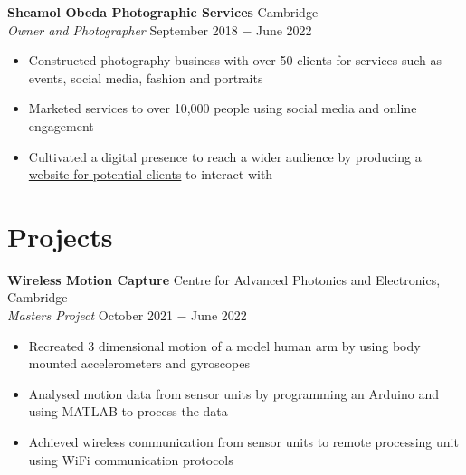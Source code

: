 \documentclass{article}
\begin{document}
\textbf{Sheamol Obeda Photographic Services} \hfill Cambridge\\
\textit{Owner and Photographer} \hfill September 2018 $-$ June 2022
\begin{itemize}
    \item Constructed photography business with over 50 clients for services such as events, social media, fashion and portraits
    \item Marketed services to over 10,000 people using social media and online engagement
    \item Cultivated a digital presence to reach a wider audience by producing a \href{www.sheamol.com}{website for potential clients} to interact with 
\end{itemize}


\vspace{-0.75\baselineskip}
\hrulefill
\vspace{-0.75\baselineskip}

\section*{Projects}

\textbf{Wireless Motion Capture} \hfill Centre for Advanced Photonics and Electronics, Cambridge\\
\textit{Masters Project} \hfill October 2021 $-$ June 2022
\begin{itemize}
    \item Recreated 3 dimensional motion of a model human arm by using body mounted accelerometers and gyroscopes
    \item Analysed motion data from sensor units by programming an Arduino and using MATLAB to process the data
    \item Achieved wireless communication from sensor units to remote processing unit using WiFi communication protocols
\end{itemize} \medskip
\end{document}
